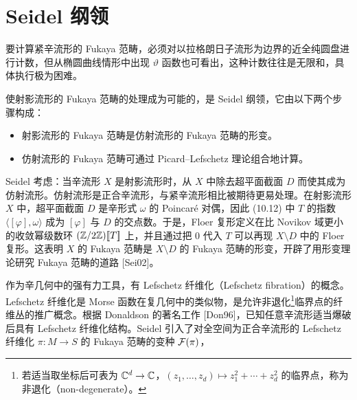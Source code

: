 \section{Seidel 纲领}

要计算紧辛流形的 Fukaya 范畴，必须对以拉格朗日子流形为边界的近全纯圆盘进行计数，但从椭圆曲线情形中出现 $\vartheta$ 函数也可看出，这种计数往往是无限和，具体执行极为困难。

使射影流形的 Fukaya 范畴的处理成为可能的，是 Seidel 纲领，它由以下两个步骤构成：

\begin{itemize}[leftmargin=2.4em]
    \item 射影流形的 Fukaya 范畴是仿射流形的 Fukaya 范畴的形变。
    \item 仿射流形的 Fukaya 范畴可通过 Picard–Lefschetz 理论组合地计算。
\end{itemize}

Seidel 考虑：当辛流形 $X$ 是射影流形时，从 $X$ 中除去超平面截面 $D$ 而使其成为仿射流形。仿射流形是正合辛流形，与紧辛流形相比被期待更易处理。在射影流形 $X$ 中，超平面截面 $D$ 是辛形式 $\omega$ 的 Poincaré 对偶，因此 (10.12) 中 $T$ 的指数 $\langle[\varphi],\omega\rangle$ 成为 $[\varphi]$ 与 $D$ 的交点数。于是，Floer 复形定义在比 Novikov 域更小的收敛幂级数环 $(\mathbb{Z}/2\mathbb{Z})[\![T]\!]$ 上，并且通过把 $0$ 代入 $T$ 可以再现 $X\setminus D$ 中的 Floer 复形。这表明 $X$ 的 Fukaya 范畴是 $X\setminus D$ 的 Fukaya 范畴的形变，开辟了用形变理论研究 Fukaya 范畴的道路 [Sei02]。

作为辛几何中的强有力工具，有 Lefschetz 纤维化（Lefschetz fibration）的概念。Lefschetz 纤维化是 Morse 函数在复几何中的类似物，是允许非退化\footnote{若适当取坐标后可表为 $\mathbb{C}^d\to\mathbb{C}$，$(z_1,\dots,z_d)\mapsto z_1^2+\cdots+z_d^2$ 的临界点，称为非退化（non-degenerate）。}临界点的纤维丛的推广概念。根据 Donaldson 的著名工作 [Don96]，已知任意辛流形适当爆破后具有 Lefschetz 纤维化结构。Seidel 引入了对全空间为正合辛流形的 Lefschetz 纤维化 $\pi\colon M\to S$ 的 Fukaya 范畴的变种 $\mathcal{F}(\pi)$，

